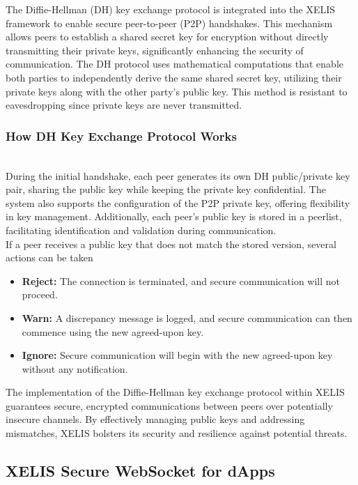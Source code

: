 \documentclass[10pt,a4paper,twocolumn]{article}
\begin{document}
The Diffie-Hellman (DH) key exchange protocol is integrated into the XELIS framework to enable secure peer-to-peer (P2P) handshakes. This mechanism allows peers to establish a shared secret key for encryption without directly transmitting their private keys, significantly enhancing the security of communication. The DH protocol uses mathematical computations that enable both parties to independently derive the same shared secret key, utilizing their private keys along with the other party's public key. This method is resistant to eavesdropping since private keys are never transmitted.\\

\subsubsection{How DH Key Exchange Protocol Works}\\

During the initial handshake, each peer generates its own DH public/private key pair, sharing the public key while keeping the private key confidential. The system also supports the configuration of the P2P private key, offering flexibility in key management. Additionally, each peer's public key is stored in a peerlist, facilitating identification and validation during communication.\\

If a peer receives a public key that does not match the stored version, several actions can be taken

\begin{itemize}
\item \textbf{Reject:} The connection is terminated, and secure communication will not proceed.
\item \textbf{Warn:} A discrepancy message is logged, and secure communication can then commence using the new agreed-upon key.
\item \textbf{Ignore:} Secure communication will begin with the new agreed-upon key without any notification.
\end{itemize}

The implementation of the Diffie-Hellman key exchange protocol within XELIS guarantees secure, encrypted communications between peers over potentially insecure channels. By effectively managing public keys and addressing mismatches, XELIS bolsters its security and resilience against potential threats.

\subsection{XELIS Secure WebSocket for dApps}
\end{document}
